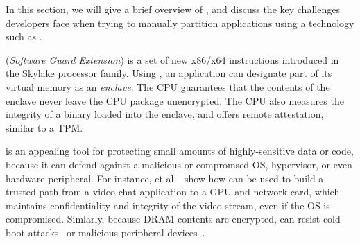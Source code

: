 \label{sec:background}
In this section, we will give a brief overview of \sgx{}, and discuss 
the key challenges developers face when trying to manually partition applications using a technology such as \sgx{}.


\intel{} \sgx{} ({\it Software Guard Extension})
is a set of new x86/x64 instructions
introduced in the \intel{} Skylake processor family.
Using \sgx{}, an 
application can designate part of its virtual memory as an {\em enclave}.
The CPU guarantees that the contents of the enclave never leave the CPU package unencrypted.
The CPU also measures the integrity of a binary loaded into the enclave, and offers remote attestation,
similar to a TPM.


\sgx{} is an appealing tool for protecting small amounts of highly-sensitive data or code, because it can defend 
against a malicious or compromsed OS, hypervisor, or even hardware peripheral.
For instance,  et al.~ show how \sgx{} can be used
to build a trusted path from a video chat application to a GPU and network card, which maintains confidentiality and integrity of the
video stream, even if the OS is compromised.
Simlarly, because DRAM contents are encrypted, \sgx{} can resist cold-boot attacks~\cite{halderman09coldboot} or 
malicious peripheral devices~\cite{hudson15thunderstrike}.



